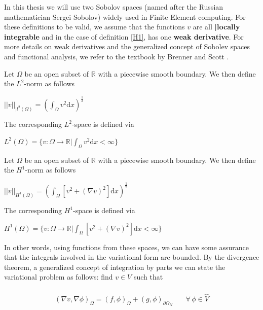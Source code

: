  In this thesis we will use two Sobolov spaces (named after the Russian mathematician Sergei Sobolov) widely used in Finite Element computing. For these definitions to be valid, we assume that the functions $v$ are all \textbf{|locally integrable} and in the case of definition \eqref{H1}, has one \textbf{weak derivative}. For more details on weak derivatives and the generalized concept of Sobolev spaces and functional analysis, we refer to the textbook by Brenner and Scott \cite{Bren07}.   
\begin{definition}
Let $\Omega$ be an open subset of $\mathbb{R}$ with a piecewise smooth boundary. We then define the $L^2$-norm as follows\\ \begin{center}
$||v||_{|l^2(\Omega)} = (\int_\Omega v^2 \mathrm{d}x)^{\frac{1}{2}}$
\end{center}
The corresponding $L^2$-space is defined via
\begin{center}
$L^2(\Omega) = \{ v:\Omega \rightarrow \mathbb{R} | \int_\Omega v^2 \mathrm{d}x < \infty \}$
\end{center}
\label{|l2}
\end{definition}
\begin{definition}
Let $\Omega$ be an open subset of $\mathbb{R}$ with a piecewise smooth boundary. We then define the $H^1$-norm as follows\\ \begin{center}
$||v||_{H^1(\Omega)} = (\int_\Omega [v^2 + (\nabla v)^2]\mathrm{d}x)^{\frac{1}{2}}$
\end{center}
The corresponding $H^1$-space is defined via
\begin{center} $H^1(\Omega) = \{ v:\Omega \rightarrow \mathbb{R} | \int_\Omega [v^2 + (\nabla v)^2] \mathrm{d}x < \infty \}$
\end{center}
\label{H1}
\end{definition}
In other words, using functions from these spaces, we can have some assurance that the integrals involved in the variational form are bounded. 
By the divergence theorem, a generalized concept of integration by parts we can state the variational problem as follows: find $v \in V$ such that \\ \\
\begin{align}
(\nabla v, \nabla \phi)_\Omega = (f,\phi)_\Omega + (g, \phi)_{\partial \Omega_N}& \quad \forall \, \phi \in \hat{V} \label{Weak_form}
\end{align}
\\
